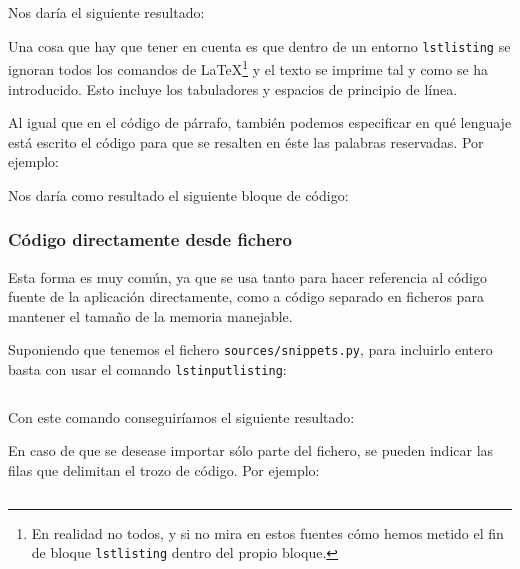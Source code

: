 

Nos daría el siguiente resultado:



Una cosa que hay que tener en cuenta es que dentro de un entorno \texttt{lstlisting} se ignoran todos los comandos de \LaTeX\space\footnote{En realidad no todos, y si no mira en estos fuentes cómo hemos metido el fin de bloque \texttt{lstlisting} dentro del propio bloque.} y el texto se imprime tal y como se ha introducido. Esto incluye los tabuladores y espacios de principio de línea.

Al igual que en el código de párrafo, también podemos especificar en qué lenguaje está escrito el código para que se resalten en éste las palabras reservadas. Por ejemplo:



Nos daría como resultado el siguiente bloque de código:
 


\subsubsection{Código directamente desde fichero}

Esta forma es muy común, ya que se usa tanto para hacer referencia al código fuente de la aplicación directamente, como a código separado en ficheros para mantener el tamaño de la memoria manejable.

Suponiendo que tenemos el fichero \texttt{sources/snippets.py}, para incluirlo entero basta con usar el comando \texttt{lstinputlisting}:

\begin{lstlisting}[language=TeX]

\end{lstlisting}

Con este comando conseguiríamos el siguiente resultado:



En caso de que se desease importar sólo parte del fichero, se pueden indicar las filas que delimitan el trozo de código. Por ejemplo:

\begin{lstlisting}[language=TeX]

\end{lstlisting}

